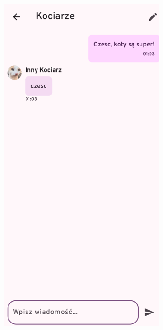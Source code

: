 \clearpage
\begin{figure}[H]
	\centering
	\begin{minipage}[b]{0.45\textwidth}
		\centering
		\includegraphics[width=\textwidth]{root/raptchat_chat_2.png}

\end{minipage}
\end{figure}
